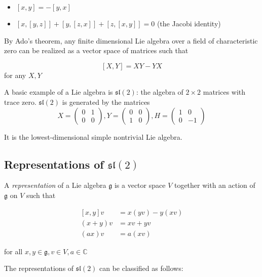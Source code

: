 \documentclass[]{article}
\newcommand{\sll}{\mathfrak{sl}}
\numberwithin{equation}{subsection}
\begin{document}
\begin{itemize}
    \item $\left[ x,y \right] = -\left[ y,x \right]$
    \item $\left[ x, \left[ y,z \right] \right] + \left[ y, \left[ z,x \right] \right] + \left[ z, \left[ x,y \right] \right] = 0$ (the Jacobi identity)
\end{itemize}

By Ado's theorem, any finite dimensional Lie algebra over a field of characteristic zero can be realized as a vector space of matrices such that 

\[ \left[ X,Y \right] = XY - YX\] 
for any $X,Y$

A basic example of a Lie algebra is $\sll(2)$: the algebra of $2 \times 2$ matrices with trace zero. $\sll(2)$ is generated by the matrices 
\begin{equation}
    X = \begin{pmatrix} 0 & 1 \\ 0 & 0 \end{pmatrix},
    Y = \begin{pmatrix} 0 & 0 \\ 1 & 0 \end{pmatrix}, 
    H = \begin{pmatrix} 1 & 0 \\ 0 &-1 \end{pmatrix}
\end{equation}

It is the lowest-dimensional simple nontrivial Lie algebra. 

\subsection{Representations of $\sll(2)$}

A \emph{representation} of a Lie algebra $\mathfrak{g}$ is a vector space $V$ together with an action of $\mathfrak{g}$ on $V$ such that 

\begin{align*}
    \left[ x,y \right] v &= x(yv) - y(xv) \\
    (x+y)v &= xv + yv \\
    (ax)v &= a(xv)
\end{align*}

for all $x,y \in \mathfrak{g}, v \in V, a \in \mathbb{C}$

The representations of $\sll(2)$ can be classified as follows: 
\end{document}
